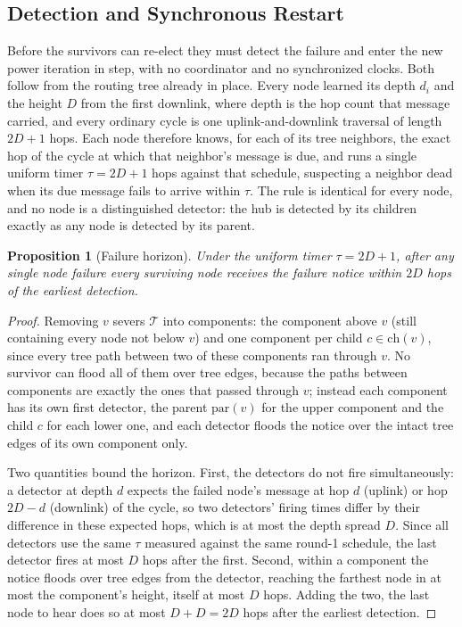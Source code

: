 \documentclass[letterpaper]{article} %
\newtheorem{proposition}{Proposition}
\begin{document}
\subsection{Detection and Synchronous Restart}

Before the survivors can re-elect they must detect the failure and enter the new
power iteration in step, with no coordinator and no synchronized clocks. Both
follow from the routing tree already in place. Every node learned its depth $d_i$
and the height $D$ from the first downlink, where depth is the hop count that
message carried, and every ordinary cycle is one uplink-and-downlink traversal of
length $2D+1$ hops. Each node therefore knows, for each of its tree neighbors, the
exact hop of the cycle at which that neighbor's message is due, and runs a single
uniform timer $\tau = 2D+1$ hops against that schedule, suspecting a neighbor dead
when its due message fails to arrive within $\tau$. The rule is identical for
every node, and no node is a distinguished detector: the hub is detected by its
children exactly as any node is detected by its parent.

\begin{proposition}[Failure horizon]
\label{prop:horizon}
Under the uniform timer $\tau = 2D+1$, after any single node failure every surviving node receives the failure notice within $2D$ hops of the earliest detection.
\end{proposition}

\begin{proof}
Removing $v$ severs $\mathcal{T}$ into components: the component above $v$ (still
containing every node not below $v$) and one component per child
$c\in\mathrm{ch}(v)$, since every tree path between two of these components ran
through $v$. No survivor can flood all of them over tree edges, because the paths
between components are exactly the ones that passed through $v$; instead each
component has its own first detector, the parent $\mathrm{par}(v)$ for the upper
component and the child $c$ for each lower one, and each detector floods the
notice over the intact tree edges of its own component only.

Two quantities bound the horizon. First, the detectors do not fire
simultaneously: a detector at depth $d$ expects the failed node's message at hop
$d$ (uplink) or hop $2D-d$ (downlink) of the cycle, so two detectors' firing
times differ by their difference in these expected hops, which is at most the
depth spread $D$. Since all detectors use the same $\tau$ measured against the
same round-1 schedule, the last detector fires at most $D$ hops after the first.
Second, within a component the notice floods over tree edges from the detector,
reaching the farthest node in at most the component's height, itself at most $D$
hops. Adding the two, the last node to hear does so at most $D + D = 2D$ hops
after the earliest detection.
\end{proof}
\end{document}
